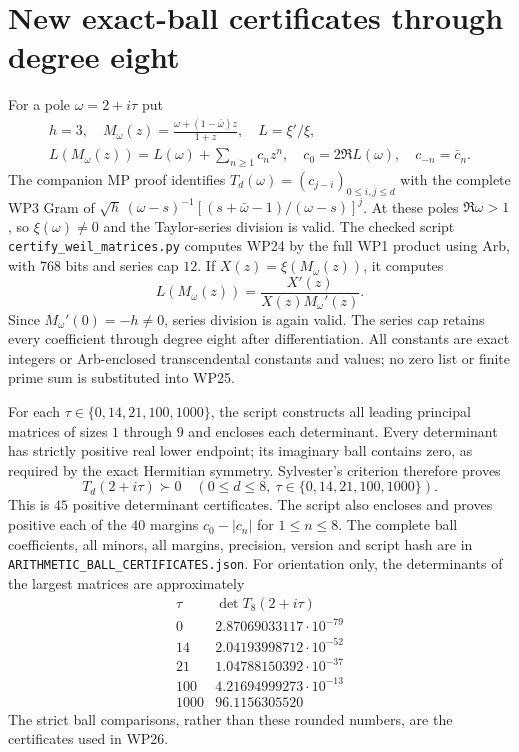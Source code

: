 \documentclass[11pt]{article}
\begin{document}
\section{New exact-ball certificates through degree eight}
For a pole $\omega=2+i\tau$ put
\[
 \begin{gathered}
 h=3,\quad M_\omega(z)=\frac{\omega+(1-\bar\omega)z}{1+z},
 \quad L=\xi'/\xi,\\
 L(M_\omega(z))=L(\omega)+\sum_{n\ge1}c_nz^n,
 \quad c_0=2\Re L(\omega),\quad c_{-n}=\bar c_n.
 \end{gathered}                                                \tag{WP24}
\]
The companion MP proof identifies $T_d(\omega)=(c_{j-i})_{0\le i,j\le d}$
with the complete WP3 Gram of
$\sqrt h\,(\omega-s)^{-1}[(s+\bar\omega-1)/(\omega-s)]^j$.
At these poles $\Re\omega>1$, so $\xi(\omega)\ne0$ and the
Taylor-series division is valid. The checked script
\texttt{certify\_weil\_matrices.py} computes WP24 by the full
WP1 product using Arb, with $768$ bits and series cap $12$.
If $X(z)=\xi(M_\omega(z))$, it computes
\[
          L(M_\omega(z))=\frac{X'(z)}{X(z)M_\omega'(z)}.
                                                                  \tag{WP25}
\]
Since $M_\omega'(0)=-h\ne0$, series division is again valid.
The series cap retains every coefficient through degree eight
after differentiation. All constants are exact integers or
Arb-enclosed transcendental constants and values; no zero list
or finite prime sum is substituted into WP25.

For each $\tau\in\{0,14,21,100,1000\}$, the script constructs
all leading principal matrices of sizes $1$ through $9$ and
encloses each determinant. Every determinant has strictly
positive real lower endpoint; its imaginary ball contains
zero, as required by the exact Hermitian symmetry. Sylvester's
criterion therefore proves
\[
 \boxed{T_d(2+i\tau)\succ0\quad
       (0\le d\le8,\ \tau\in\{0,14,21,100,1000\}).}           \tag{WP26}
\]
This is $45$ positive determinant certificates. The script
also encloses and proves positive each of the $40$ margins
$c_0-|c_n|$ for $1\le n\le8$. The complete ball coefficients,
all minors, all margins, precision, version and script hash are
in \texttt{ARITHMETIC\_BALL\_CERTIFICATES.json}. For orientation
only, the determinants of the largest matrices are approximately
\[
\begin{array}{c|r}
\tau&\det T_8(2+i\tau)\\\hline
0&2.87069033117\cdot10^{-79}\\
14&2.04193998712\cdot10^{-52}\\
21&1.04788150392\cdot10^{-37}\\
100&4.21694999273\cdot10^{-13}\\
1000&96.1156305520
\end{array}                                                     \tag{WP27}
\]
The strict ball comparisons, rather than these rounded
numbers, are the certificates used in WP26.
\end{document}
